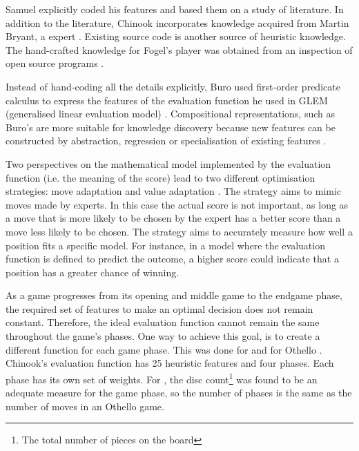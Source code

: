Samuel \cite{samuel:checkers} explicitly coded his features and based them on a study of  literature.   In addition to the literature, Chinook incorporates knowledge acquired from Martin Bryant, a  expert \cite{schaeffer:reexamination}. Existing source code is another source of heuristic knowledge. The hand-crafted knowledge for Fogel's  player was obtained from an inspection of open source  programs \cite{fogel:chess}. 

Instead of hand-coding all the details explicitly, Buro used first-order predicate calculus to express the features of the evaluation function he used in GLEM (generalised linear evaluation model) \cite{buro:feature}. Compositional representations, such as Buro's are more suitable for knowledge discovery because new features can be constructed by abstraction, regression or specialisation of existing features \cite{furnkranz:survey}.

Two perspectives on the mathematical model implemented by the evaluation  function (i.e. the meaning of the score) lead to two different optimisation strategies: move adaptation and value adaptation \cite{buro:statistical}.  The  strategy aims to mimic moves made by experts.  In this case the actual score is not important, as long as a move that is more likely to be chosen by the expert has a better score than a move less likely to be chosen. The   strategy aims to accurately measure how well a position fits a specific model.  For instance, in a model where the evaluation function is defined to predict the outcome, a higher score could indicate that a position has a greater chance of winning.  

As a game progresses from its opening and middle game to the endgame phase, the required set of features  to make an optimal decision does not remain constant.  Therefore, the ideal evaluation function cannot remain the same throughout the game's phases.  One way to achieve this goal, is  to create a different  function for each game phase.  This was done for  and for Othello \cite{schaeffer:solving, buro:statistical}.   Chinook's evaluation function has 25 heuristic features and four phases. Each phase has its own set of weights.  For , the disc count\footnote{The total number of pieces on the board} was found to be an adequate measure for the game phase, so the number of phases is the same as the number of moves in an Othello game.   
  
